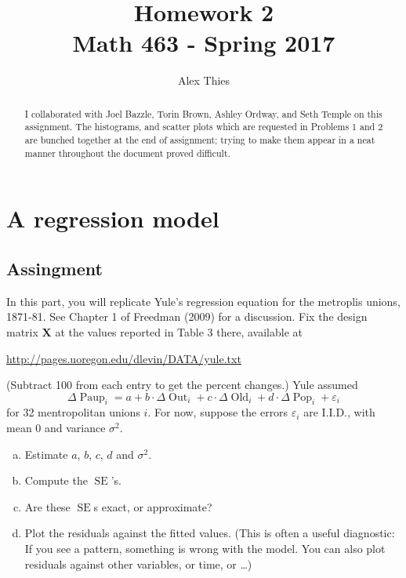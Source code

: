\documentclass{amsart}
\author{Alex Thies}
\title{Homework 2 \\ Math 463 - Spring 2017}
\DeclareMathOperator{\SE}{\text{SE}}
\DeclareMathOperator{\Paup}{\text{Paup}}
\DeclareMathOperator{\Out}{\text{Out}}
\DeclareMathOperator{\Old}{\text{Old}}
\DeclareMathOperator{\Pop}{\text{Pop}}
\newcommand{\X}{{\mathbf{X}}}
\newcommand{\ep}{\varepsilon}
\begin{document}
	\begin{abstract}
		I collaborated with Joel Bazzle, Torin Brown, Ashley Ordway, and Seth Temple on this assignment. 
		The histograms, and scatter plots which are requested in Problems 1 and 2 are bunched together at the end of assignment; trying to make them appear in a neat manner throughout the document proved difficult.
	\end{abstract}

	\maketitle

	\section{A regression model} %
	\label{sec:a_regression_model}
		\subsection{Assingment} %
		\label{sub:assingment1}
			In this part, you will replicate Yule's regression equation for the metroplis unions, 1871-81. 
			See Chapter 1 of Freedman (2009) for a discussion. 
			Fix the design matrix $\X$ at the values reported in Table 3 there, available at 

			\color{red}\url{http://pages.uoregon.edu/dlevin/DATA/yule.txt}
			
			\color{black}(Subtract 100 from each entry to get the percent changes.) 
			Yule assumed $$\Delta \Paup_{i} = a + b \cdot \Delta \Out_{i} + c \cdot \Delta \Old_{i} + d \cdot \Delta \Pop_{i} + \ep_{i}$$ for 32 mentropolitan unions $i$. 
			For now, suppose the errors $\ep_{i}$ are I.I.D., with mean 0 and variance $\sigma^{2}$.
			\begin{enumerate}[(a)]
				\item Estimate $a$, $b$, $c$, $d$ and $\sigma^{2}$.
				\item Compute the $\SE$’s.
				\item Are these $\SE$s exact, or approximate?
				\item Plot the residuals against the fitted values. 
				(This is often a useful diagnostic: If you see a pattern, something is wrong with the model.
				You can also plot residuals against other variables, or time, or \dots)
			\end{enumerate}
\end{document}
